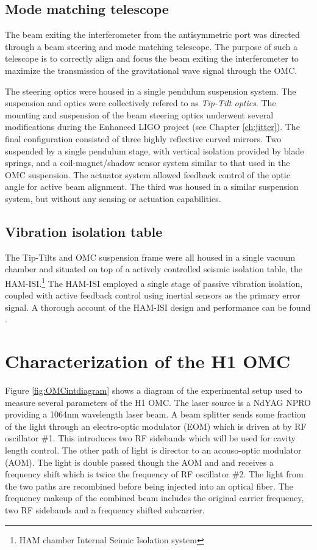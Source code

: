 \subsection{Mode matching telescope}
The beam exiting the interferometer from the antisymmetric port was directed through a beam steering and mode matching telescope. %
The purpose of such a telescope is to correctly align and focus the beam exiting the interferometer to maximize the transmission of the gravitational wave signal through the OMC.

The steering optics were housed in a single pendulum suspension system. %
The suspension and optics were collectively refered to as \emph{Tip-Tilt optics}. %
The mounting and suspension of the beam steering optics underwent several modifications during the Enhanced LIGO project (see Chapter \ref{ch:jitter}). %
The final configuration consisted of three highly reflective curved mirrors. %
Two suspended by a single pendulum stage, with vertical isolation provided by blade springs, and a coil-magnet/shadow sensor system similar to that used in the OMC suspension. %
The actuator system allowed feedback control of the optic angle for active beam alignment. %
The third was housed in a similar suspension system, but without any sensing or actuation capabilities.

\subsection{Vibration isolation table}
The Tip-Tilts and OMC suspension frame were all housed in a single vacuum chamber and situated on top of a actively controlled seismic isolation table, the HAM-ISI.\footnote{HAM chamber Internal Seimic Isolation system} The HAM-ISI employed a single stage of passive vibration isolation, coupled with active feedback control using inertial sensors as the primary error signal. %
A thorough account of the HAM-ISI design and performance can be found .

\section{Characterization of the H1 OMC}

Figure \ref{fig:OMCintdiagram} shows a diagram of the experimental setup used to measure several parameters of the H1 OMC. %
The laser source is a NdYAG NPRO providing a 1064nm wavelength laser beam. %
A beam splitter sends some fraction  of the light through an electro-optic modulator (EOM) which is driven at by RF oscillator \#1. %
This introduces two RF sidebands which will be used for cavity length control. %
The other path of light is director to an acouso-optic modulator (AOM). %
The light is double passed though the AOM and and receives a frequency shift which is twice the frequency of RF oscillator \#2. %
The light from the two paths are recombined before being injected into an optical fiber. %
The frequency makeup of the combined beam includes the original carrier frequency, two RF sidebands and a frequency shifted subcarrier.


